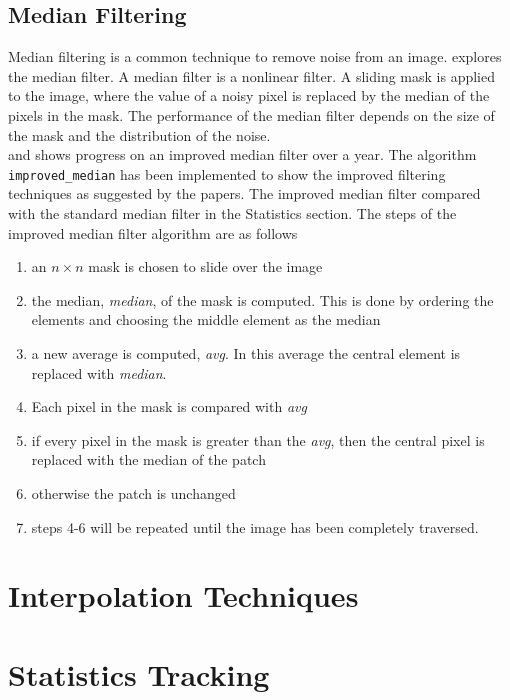 \documentclass{article}
\begin{document}
\subsection{Median Filtering}
%
\begin{flushleft}
  Median filtering is a common technique to remove noise from an
  image. \cite{Med2012} explores the median filter. A median filter is a
  nonlinear filter. A sliding mask is applied to the image, where the
  value of a noisy pixel is replaced by the median of the pixels in
  the mask. The performance of the median filter depends on the size
  of the mask and the distribution of the noise.\\
   \cite{improved-median} and \cite{Med2012} shows progress on an
   improved median filter over a year. The algorithm
   \texttt{improved\_median} has been implemented to show the improved
   filtering techniques as suggested by the papers. The improved
   median filter compared with
   the standard median filter in the Statistics section. The steps of
   the improved median filter algorithm are as
   follows
   \begin{enumerate}
   \item an $n\times n$ mask is chosen to slide over the image
     \item the median, \textit{median}, of the mask is computed. This
       is done by ordering the elements and choosing the middle
       element as the median
       \item a new average is computed, \textit{avg}. In this average the
         central element is replaced with \textit{median}.
         \item Each pixel in the mask is compared with
           \textit{avg}
           \item if every pixel in the mask is greater than the
             \textit{avg}, then the central pixel is replaced with the
             median of the patch
           \item otherwise the patch is unchanged
             \item steps 4-6 will be repeated until the image has been
               completely traversed.
     \end{enumerate}
   
  \end{flushleft}
%
\section{Interpolation Techniques}
%
\section{Statistics Tracking}
%
\newpage
\printbibliography
\end{document}
